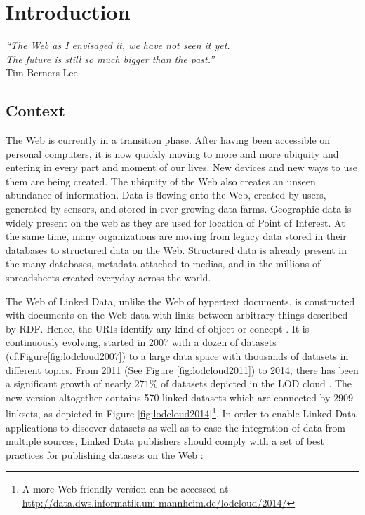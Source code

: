 \chapter{Introduction}
\label{intro}

\begin{flushright}
\textit{``The Web as I envisaged it, we have not seen it yet.\\ 
The future is still so much bigger than the past.''\\}
Tim Berners-Lee
\end{flushright}


\section{Context}
\label{sec:context}
The Web is currently in a transition phase. After having been accessible on personal computers, it is now 
quickly moving to more and more ubiquity and entering in every part and moment of our lives. New devices and new ways to use them are being created. The ubiquity of the Web also creates an unseen 
abundance of information. Data is flowing onto the Web, created by users, generated by sensors, and stored in ever growing data farms. Geographic data is widely present on the web as they are used for location of Point of Interest. At the same time, many organizations are moving from legacy data stored in their databases
to structured data on the Web. Structured data is already present in the many databases, metadata attached to medias, and in the millions of spreadsheets created everyday across the world.

The Web of Linked Data, unlike the Web of hypertext documents, is constructed with documents on the Web data with links between arbitrary things described by RDF. Hence, the URIs identify any kind of object or concept \cite{timld}. It is continuously evolving, started in 2007 with a dozen of datasets (cf.Figure\ref{fig:lodcloud2007}) to a large data space with thousands of datasets in different topics. From 2011 (See Figure \ref{fig:lodcloud2011})\cite{jentzsch2011} to 2014, there has been a significant growth of nearly $271\%$ of datasets depicted in the LOD cloud \cite{max2014}. The new version altogether contains 570 linked datasets which are connected by 2909 linksets, as depicted in Figure \ref{fig:lodcloud2014}\footnote{A more Web friendly version can be accessed at \url{http://data.dws.informatik.uni-mannheim.de/lodcloud/2014/}}. In order to enable
Linked Data applications to discover datasets as well as to ease the integration of data from multiple sources, Linked Data publishers should comply with a set of best practices for publishing datasets on the Web \cite{Heath2011}:

